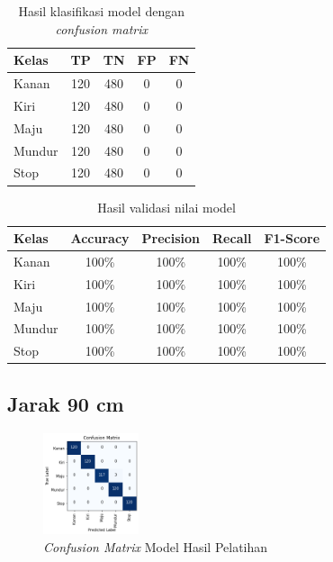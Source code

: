 \begin{longtable}{|l|c|c|c|c|}
  \caption{Hasil klasifikasi model dengan \emph{confusion matrix}}
  \label{tb:cm_model4} \\
  \hline
  \rowcolor[HTML]{C0C0C0} 
  \textbf{Kelas} & \textbf{TP} & \textbf{TN} & \textbf{FP} & \textbf{FN} \\ \hline
  Kanan    & 120          & 480         & 0           & 0           \\ \hline
  Kiri      & 120          & 480         & 0           & 0           \\ \hline
  Maju      & 120          & 480         & 0           & 0           \\ \hline
  Mundur     & 120          & 480         & 0           & 0           \\ \hline
  Stop  & 120          & 480         & 0           & 0           \\ \hline
\end{longtable}

\begin{longtable}{|l|c|c|c|c|}
  \caption{Hasil validasi nilai model}
  \label{tb:vs_model4} \\
  \hline
  \rowcolor[HTML]{C0C0C0} 
  \textbf{Kelas} & \textbf{Accuracy} & \textbf{Precision} & \textbf{Recall} & \textbf{F1-Score} \\ \hline
  Kanan    & 100\%            & 100\%             & 100\%           & 100\%            \\ \hline
  Kiri     & 100\%          & 100\%           & 100\%           & 100\%           \\ \hline
  Maju      & 100\%          & 100\%           & 100\%          & 100\%          \\ \hline
  Mundur     & 100\%            & 100\%             & 100\%           & 100\%            \\ \hline
  Stop  & 100\%            & 100\%             & 100\%           & 100\%            \\ \hline
\end{longtable}

\subsection{Jarak 90 cm}

\begin{figure} [ht] \centering
  \includegraphics[width=0.25\textwidth]{gambar/bab4/model8 (90cm)/matrix.png}
  \caption{\emph{Confusion Matrix} Model Hasil Pelatihan}
  \label{fig:matrix5}
\end{figure}

